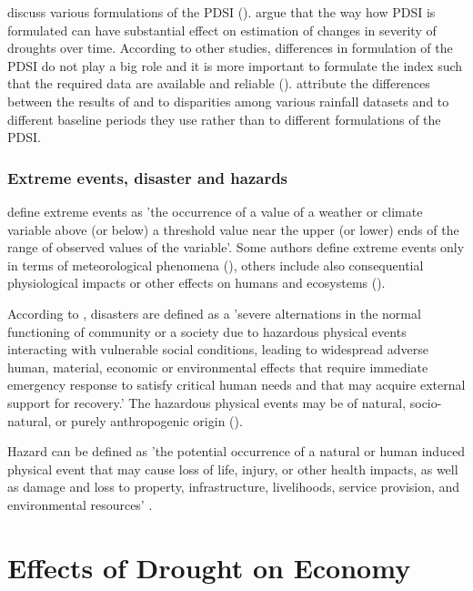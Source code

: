 \documentclass[a4paper,12pt]{article}
\begin{document}
\cite{Trenberth2014} discuss various formulations of the PDSI (\citealt{Sheffield2012, Dai2011}).  \cite{Sheffield2012} argue that the way  how PDSI is formulated can have substantial effect on estimation of changes in severity of droughts over time. According to other studies, differences in formulation of the PDSI do not play a big role and it is more important to formulate the index such that the required data are available and reliable (\citealp{Trenberth2014,vanderSchrier2011,Wang2012}). \cite{Trenberth2014} attribute the differences between the results of \cite{Sheffield2012} and \cite{Trenberth2014} to disparities among various rainfall datasets and to different baseline periods they use rather than to different formulations of the PDSI.   



\subsubsection*{Extreme events, disaster and hazards}
\cite{IPCC2012ch1} define extreme events as 'the occurrence of a value of a weather or climate variable above (or below) a threshold value near the upper (or lower) ends of the range of observed values of the variable'. Some authors define extreme events only in terms of meteorological phenomena (\citealp{easterling2000, Jentsch2007}), others include also consequential physiological impacts or other effects on humans and ecosystems (\citealp{IPCC2012ch1, young2002}).


According to \cite{IPCC2012ch1}, disasters are defined as a 'severe alternations in the normal functioning of community or a society due to hazardous physical events interacting with vulnerable social conditions, leading to widespread adverse human, material, economic or environmental effects that require immediate emergency response to satisfy critical human needs and that may acquire external support for recovery.' The hazardous physical events may be of natural, socio-natural, or purely anthropogenic origin (\citealp{IPCC2012ch1, wisner2004risk}).

Hazard can be defined as 'the potential occurrence of a natural or human induced
physical event that may cause loss of life, injury, or other
health impacts, as well as damage and loss to property, infrastructure,
livelihoods, service provision, and environmental resources' \citet{IPCC2012ch1}.
 \section*{Effects of Drought on Economy}
 
\end{document}
